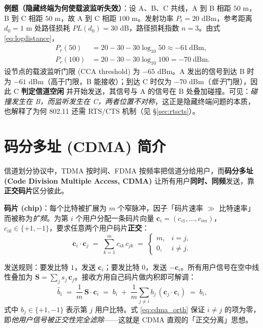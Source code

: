 \textbf{例题（隐藏终端为何使载波监听失效）}：设 A、B、C 共线，A 到 B 相距 $50$ m，B 到 C 相距 $50$ m，故 A 到 C 相距 $100$ m。发射功率 $P_t=20$ dBm，参考距离 $d_0=1$ m 处路径损耗 $PL(d_0)=30$ dB，路径损耗指数 $n=3$。由式 \eqref{eq:logdistance}，
\begin{align}
    P_r(50)  &= 20 - 30 - 30\log_{10} 50 \approx -61\ \mathrm{dBm}, \\
    P_r(100) &= 20 - 30 - 30\log_{10} 100 = -70\ \mathrm{dBm}.
\end{align}
设节点的载波监听门限 (CCA threshold) 为 $-65$ dBm。A 发出的信号到达 B 时为 $-61$ dBm（高于门限，B 能接收）；到达 C 时仅为 $-70$ dBm（\emph{低于}门限），因此 C \textbf{判定信道空闲} 并开始发送，其信号与 A 的信号在 B 处叠加碰撞。可见：\emph{碰撞发生在 B，而监听发生在 C，两者位置不对称}，这正是隐藏终端问题的本质，也解释了为何 802.11 还需 RTS/CTS 机制（见 \S \ref{sec:rtscts}）。

\section{码分多址 (CDMA) 简介}

信道划分协议中，TDMA 按时间、FDMA 按频率把信道分给用户，而\textbf{码分多址 (Code Division Multiple Access, CDMA)} 让所有用户\textbf{同时、同频}发送，靠\textbf{正交码片}区分彼此。

\textbf{码片 (chip)}：每个比特被扩展为 $m$ 个窄脉冲，因子「码片速率 $\gg$ 比特速率」而被称为\emph{扩频}。为第 $i$ 个用户分配一条码片向量 $\mathbf{c}_i=(c_{i1},\dots,c_{im})$，$c_{ik}\in\{+1,-1\}$，要求任意两个用户码片\textbf{正交}：
\begin{equation}
    \mathbf{c}_i \cdot \mathbf{c}_j \;=\; \sum_{k=1}^{m} c_{ik}\,c_{jk} \;=\;
    \begin{cases}
        m, & i=j,\\
        0, & i\neq j.
    \end{cases}
    \label{eq:cdma_orth}
\end{equation}

发送规则：要发比特 $1$，发送 $\mathbf{c}_i$；要发比特 $0$，发送 $-\mathbf{c}_i$。所有用户信号在空中线性叠加为 $\mathbf{S}=\sum_j s_j\,\mathbf{c}_j$。接收方用自己码片做内积即可解调：
\begin{equation}
    \hat{b}_i \;=\; \frac{1}{m}\,\mathbf{S}\cdot\mathbf{c}_i
    \;=\; b_i \;+\; \frac{1}{m}\sum_{j\neq i} b_j\,(\mathbf{c}_j\cdot\mathbf{c}_i)
    \;=\; b_i,
    \label{eq:cdma_decode}
\end{equation}
式中 $b_j\in\{+1,-1\}$ 表示第 $j$ 用户比特。式 \eqref{eq:cdma_orth} 保证 $i\neq j$ 的项为零，即\emph{他用户信号被正交性完全滤除}——这就是 CDMA 直观的「正交分离」思想。


